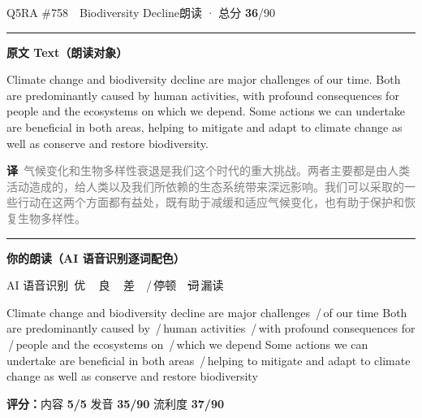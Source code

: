 \documentclass[11pt]{article}
\newcommand{\sfull}[1]{\textcolor{cFix}{\bfseries #1}}     %
\newcommand{\spart}[1]{\textcolor{cPartial}{\bfseries #1}} %
\newcommand{\ptesub}[1]{%
  \par\needspace{2\baselineskip}\smallskip
  {\color{cAccent}\rule[-0.2ex]{3pt}{1.05em}}\hspace{6pt}%
  {\bfseries\color{cHead}#1}\par\nopagebreak\smallskip}
\newcommand{\sg}[1]{\textcolor{cSpkGood}{#1}}   %
\newcommand{\sy}[1]{\textcolor{cSpkOk}{#1}}     %
\newcommand{\sr}[1]{\textcolor{cSpkBad}{#1}}    %
\newcommand{\pse}{{\color{gray}\,/\,}}          %
\newcommand{\asrlegend}{{\footnotesize\color{gray}AI 语音识别\quad
  {\color{cSpkGood}\textbullet}\,优\ \ {\color{cSpkOk}\textbullet}\,良\ \
  {\color{cSpkBad}\textbullet}\,差\ \ {\color{gray}/}\,停顿\ \
  {\color{cSpkBad}\sout{词}}\,漏读}}
\newcommand{\zh}[1]{{\footnotesize\textcolor{cNote}{\textbf{译}}\ \textcolor{gray}{#1}}}
\begin{document}
\begin{qblock}{Q5\quad RA \#758\ \ Biodiversity Decline}{朗读 · 总分 \textcolor{cAccent}{\bfseries 36}/90}
\ptesub{原文 Text（朗读对象）}
\begin{promptbox}
Climate change and biodiversity decline are major challenges of our time. Both are predominantly caused by human activities, with profound consequences for people and the ecosystems on which we depend. Some actions we can undertake are beneficial in both areas, helping to mitigate and adapt to climate change as well as conserve and restore biodiversity.
\end{promptbox}
\zh{气候变化和生物多样性衰退是我们这个时代的重大挑战。两者主要都是由人类活动造成的，给人类以及我们所依赖的生态系统带来深远影响。我们可以采取的一些行动在这两个方面都有益处，既有助于减缓和适应气候变化，也有助于保护和恢复生物多样性。}
\ptesub{你的朗读（AI 语音识别逐词配色）}
\asrlegend
\begin{asrbox}
\sy{Climate} \sg{change} \sg{and} \sg{biodiversity} \sg{decline} \sg{are} \sg{major} \sr{challenges} \pse \sy{of} \sg{our} \sg{time} \sg{Both} \sg{are} \sr{predominantly} \sy{caused} \sg{by} \pse \sy{human} \sg{activities} \pse \sg{with} \sg{profound} \sy{consequences} \sg{for} \pse \sg{people} \sg{and} \sg{the} \sr{ecosystems} \sg{on} \pse \sg{which} \sg{we} \sg{depend} \sg{Some} \sg{actions} \sg{we} \sg{can} \sg{undertake} \sg{are} \sg{beneficial} \sg{in} \sg{both} \sy{areas} \pse \sr{helping} \sg{to} \sr{mitigate} \sg{and} \sy{adapt} \sg{to} \sg{climate} \sy{change} \sg{as} \sy{well} \sg{as} \sg{conserve} \sg{and} \sg{restore} \sg{biodiversity}
\end{asrbox}
\smallskip
{\small\textbf{评分：}内容 \sfull{5/5} \quad\textperiodcentered\quad 发音 \spart{35/90} \quad\textperiodcentered\quad 流利度 \spart{37/90}}\quad{\footnotesize\color{gray}（用时 01:15）}
\end{qblock}
\end{document}
